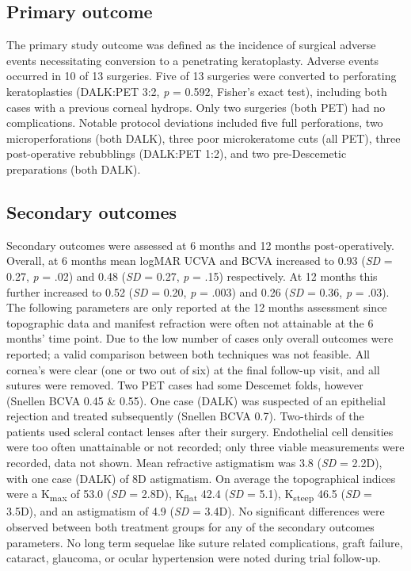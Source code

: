 \documentclass[authordate, empirical]{jote-new-article}
\begin{document}
	\subsection{Primary outcome}



	The primary study outcome was defined as the incidence of surgical adverse events necessitating conversion to a penetrating keratoplasty. Adverse events occurred in 10 of 13 surgeries. Five of 13 surgeries were converted to perforating keratoplasties (DALK:PET 3:2, \emph{p} = 0.592, Fisher's exact test), including both cases with a previous corneal hydrops. Only two surgeries (both PET) had no complications. Notable protocol deviations included five full perforations, two microperforations (both DALK), three poor microkeratome cuts (all PET), three post-operative rebubblings (DALK:PET 1:2), and two pre-Descemetic preparations (both DALK).



	\subsection{Secondary outcomes}



	Secondary outcomes were assessed at 6 months and 12 months post-operatively. Overall, at 6 months mean logMAR UCVA and BCVA increased to 0.93 (\emph{SD }=\emph{ }0.27, \emph{p }= .02) and 0.48 (\emph{SD }=\emph{ }0.27, \emph{p} = .15) respectively. At 12 months this further increased to 0.52 (\emph{SD }=\emph{ }0.20, \emph{p }= .003) and 0.26 (\emph{SD }=\emph{ }0.36, \emph{p }= .03). The following parameters are only reported at the 12 months assessment since topographic data and manifest refraction were often not attainable at the 6 months' time point. Due to the low number of cases only overall outcomes were reported; a valid comparison between both techniques was not feasible. All cornea's were clear (one or two out of six) at the final follow-up visit, and all sutures were removed. Two PET cases had some Descemet folds, however (Snellen BCVA 0.45 \& 0.55). One case (DALK) was suspected of an epithelial rejection and treated subsequently (Snellen BCVA 0.7). Two-thirds of the patients used scleral contact lenses after their surgery. Endothelial cell densities were too often unattainable or not recorded; only three viable measurements were recorded, data not shown. Mean refractive astigmatism was 3.8 (\emph{SD }=\emph{ }2.2D), with one case (DALK) of 8D astigmatism. On average the topographical indices were a K\textsubscript{max} of 53.0 (\emph{SD }=\emph{ }2.8D), K\textsubscript{flat} 42.4 (\emph{SD }= 5.1), K\textsubscript{steep }46.5 (\emph{SD }= 3.5D), and an astigmatism of 4.9 (\emph{SD }= 3.4D). No significant differences were observed between both treatment groups for any of the secondary outcomes parameters. No long term sequelae like suture related complications, graft failure, cataract, glaucoma, or ocular hypertension were noted during trial follow-up.
\end{document}
